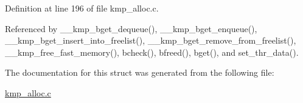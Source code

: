 Definition at line 196 of file kmp\-\_\-alloc.\-c.



Referenced by \-\_\-\-\_\-kmp\-\_\-bget\-\_\-dequeue(), \-\_\-\-\_\-kmp\-\_\-bget\-\_\-enqueue(), \-\_\-\-\_\-kmp\-\_\-bget\-\_\-insert\-\_\-into\-\_\-freelist(), \-\_\-\-\_\-kmp\-\_\-bget\-\_\-remove\-\_\-from\-\_\-freelist(), \-\_\-\-\_\-kmp\-\_\-free\-\_\-fast\-\_\-memory(), bcheck(), bfreed(), bget(), and set\-\_\-thr\-\_\-data().



The documentation for this struct was generated from the following file\-:\begin{DoxyCompactItemize}
\item 
\hyperlink{kmp__alloc_8c}{kmp\-\_\-alloc.\-c}\end{DoxyCompactItemize}
